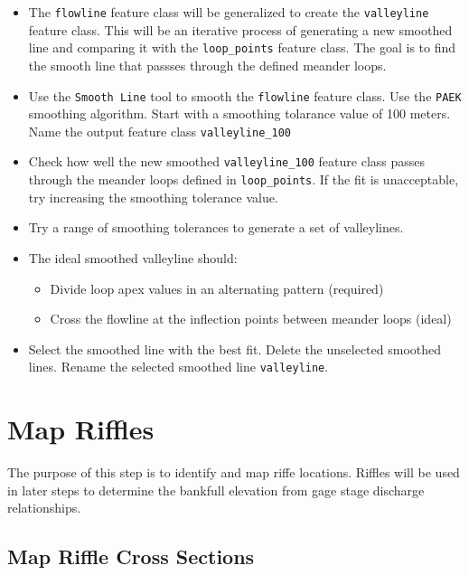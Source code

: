 \documentclass[]{book}
\providecommand{\tightlist}{%
  \setlength{\itemsep}{0pt}\setlength{\parskip}{0pt}}
\theoremstyle{definition}
\theoremstyle{definition}
\theoremstyle{definition}
\theoremstyle{remark}
\begin{document}
\begin{itemize}
\tightlist
\item
  The \texttt{flowline} feature class will be generalized to create the
  \texttt{valleyline} feature class. This will be an iterative process
  of generating a new smoothed line and comparing it with the
  \texttt{loop\_points} feature class. The goal is to find the smooth
  line that passses through the defined meander loops.
\item
  Use the \texttt{Smooth\ Line} tool to smooth the \texttt{flowline}
  feature class. Use the \texttt{PAEK} smoothing algorithm. Start with a
  smoothing tolarance value of 100 meters. Name the output feature class
  \texttt{valleyline\_100}
\item
  Check how well the new smoothed \texttt{valleyline\_100} feature class
  passes through the meander loops defined in \texttt{loop\_points}. If
  the fit is unacceptable, try increasing the smoothing tolerance value.
\item
  Try a range of smoothing tolerances to generate a set of valleylines.
\item
  The ideal smoothed valleyline should:

  \begin{itemize}
  \tightlist
  \item
    Divide loop apex values in an alternating pattern (required)
  \item
    Cross the flowline at the inflection points between meander loops
    (ideal)
  \end{itemize}
\item
  Select the smoothed line with the best fit. Delete the unselected
  smoothed lines. Rename the selected smoothed line \texttt{valleyline}.
\end{itemize}

\section{Map Riffles}\label{map-riffles-1}

The purpose of this step is to identify and map riffe locations. Riffles
will be used in later steps to determine the bankfull elevation from
gage stage discharge relationships.

\subsection{Map Riffle Cross Sections}\label{map-riffle-cross-sections}
\end{document}
